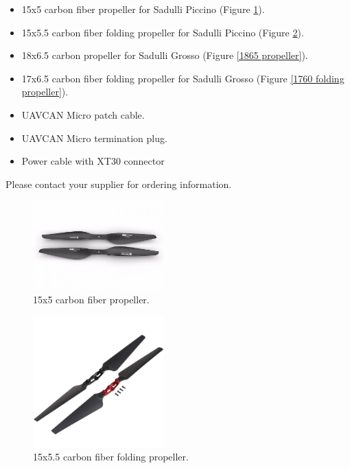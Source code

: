 \documentclass{zubaxdoc}
\begin{document}
\begin{itemize}
    \item 15x5 carbon fiber propeller for Sadulli Piccino (Figure \ref{1555 propeller}).
    \item 15x5.5 carbon fiber folding propeller for Sadulli Piccino (Figure \ref{1555 folding propeller}).
    \item 18x6.5 carbon propeller for Sadulli Grosso (Figure \ref{1865 propeller}). 
    \item 17x6.5 carbon fiber folding propeller for Sadulli Grosso (Figure \ref{1760 folding propeller}).    
    \item UAVCAN Micro patch cable.
    \item UAVCAN Micro termination plug.
    \item Power cable with XT30 connector
\end{itemize}

Please contact your supplier for ordering information.

\begin{figure}[tb]
    \centering
    \includegraphics[width=0.45\textwidth]{1551propeller} 
    \caption{15x5 carbon fiber propeller.\label{1555 propeller}}
\end{figure}

\begin{figure}[tb]
    \centering
    \includegraphics[width=0.45\textwidth]{1555propeller} 
    \caption{15x5.5 carbon fiber folding propeller.\label{1555 folding propeller}}
\end{figure}
\end{document}
